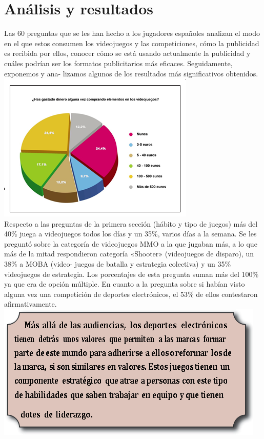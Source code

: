 \documentclass[a4paper,11pt]{article}
\begin{document}
\section{Análisis y resultados}
Las 60 preguntas que se les han hecho a los jugadores españoles analizan el modo en el que estos consumen los videojuegos y las competiciones, cómo la publicidad es recibida por ellos, conocer cómo se está usando actualmente la publicidad y cuáles podrían ser los formatos publicitarios más eficaces. Seguidamente, exponemos y ana- lizamos algunos de los resultados más significativos obtenidos.\\
\includegraphics[scale=1]{FIGURA2.png} \\
Respecto a las preguntas de la primera sección (hábito y tipo de juegos) más del 40\% juega a videojuegos todos los días y un 35\%, varios días a la semana. Se les preguntó sobre la categoría de videojuegos MMO a la que jugaban más, a lo que más de la mitad respondieron categoría «Shooter» (videojuegos de disparo), un 38\% a MOBA (video- juegos de batalla y estrategia colectiva) y un 35\% videojuegos de estrategia. Los porcentajes de esta pregunta suman más del 100\% ya que era de opción múltiple. En cuanto a la pregunta sobre si habían visto alguna vez una competición de deportes electrónicos, el 53\% de ellos contestaron afirmativamente.\\
\includegraphics[scale=1]{FIGURA1.png} 
\end{document}
